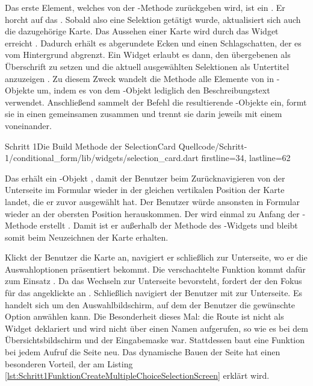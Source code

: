 Das erste Element, welches von der -Methode zurückgeben wird, ist ein  .
Er horcht auf das  .
Sobald also eine Selektion getätigt wurde, aktualisiert sich auch die dazugehörige Karte.
Das Aussehen einer Karte wird durch das Widget  erreicht .
Dadurch erhält es abgerundete Ecken und einen Schlagschatten, der es vom Hintergrund abgrenzt.
Ein  Widget erlaubt es dann, den übergebenen  als Überschrift zu setzen  und die aktuell ausgewählten Selektionen als Untertitel anzuzeigen .
Zu diesem Zweck wandelt die Methode  alle Elemente von  in -Objekte um, indem es von dem -Objekt lediglich den Beschreibungstext  verwendet.
Anschließend sammelt der Befehl  die resultierende -Objekte ein, formt sie in einen gemeinsamen  zusammen und trennt sie darin jeweils mit einem  voneinander.

\begin{alexlisting}{Schritt 1}{Die Build Methode der SelectionCard}
  {Quellcode/Schritt-1/conditional_form/lib/widgets/selection_card.dart}
  {firstline=34, lastline=62}
  \label{lst:Schritt1BuildMethodeDerSelectionCard}
\end{alexlisting}

Das  erhält ein -Objekt , damit der Benutzer beim Zurücknavigieren von der Unterseite im Formular wieder in der gleichen vertikalen Position der Karte landet, die er zuvor ausgewählt hat.
Der Benutzer würde ansonsten in Formular wieder an der obersten Position herauskommen.
Der  wird einmal zu Anfang der -Methode erstellt .
Damit ist er außerhalb der Methode  des -Widgets und bleibt somit beim Neuzeichnen der Karte erhalten.

\ifIncludeFigures \clearpage \fi
Klickt der Benutzer die Karte an, navigiert er schließlich zur Unterseite, wo er die Auswahloptionen präsentiert bekommt.
Die verschachtelte Funktion  kommt dafür zum Einsatz .
Da das Wechseln zur Unterseite bevorsteht, fordert der  den Fokus für das angeklickte  an .
Schließlich navigiert der Benutzer mit  zur Unterseite. Es handelt sich um den Auswahlbildschirm, auf dem der Benutzer die gewünschte Option anwählen kann. Die Besonderheit dieses Mal: die Route ist nicht als Widget deklariert und wird nicht über einen Namen aufgerufen, so wie es bei dem Übersichtsbildschirm und der Eingabemaske war. Stattdessen baut eine Funktion bei jedem Aufruf die Seite neu. Das dynamische Bauen der Seite hat einen besonderen Vorteil, der am Listing \ref{lst:Schritt1FunktionCreateMultipleChoiceSelectionScreen} erklärt wird.







